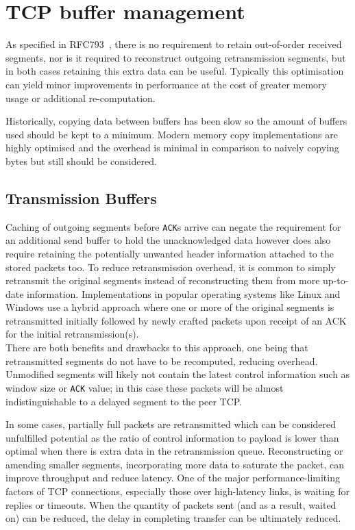     \section{TCP buffer management}
        As specified in RFC793~\cite{rfc793}, there is no requirement to retain out-of-order received segments, nor is it required to reconstruct outgoing retransmission segments, but in both cases retaining this extra data can be useful. Typically this optimisation can yield minor improvements in performance at the cost of greater memory usage or additional re-computation.

        Historically, copying data between buffers has been slow so the amount of buffers used should be kept to a minimum. Modern memory copy implementations are highly optimised and the overhead is minimal in comparison to naively copying bytes but still should be considered.

        \subsection{Transmission Buffers}
            Caching of outgoing segments before \texttt{ACK}s arrive can negate the requirement for an additional send buffer to hold the unacknowledged data however does also require retaining the potentially unwanted header information attached to the stored packets too. To reduce retransmission overhead, it is common to simply retransmit the original segments instead of reconstructing them from more up-to-date information. Implementations in popular operating systems like Linux and Windows use a hybrid approach where one or more of the original segments is retransmitted initially followed by newly crafted packets upon receipt of an ACK for the initial retransmission(s). \\ %
            There are both benefits and drawbacks to this approach, one being that retransmitted segments do not have to be recomputed, reducing overhead. Unmodified segments will likely not contain the latest control information such as window size or \texttt{ACK} value; in this case these packets will be almost indistinguishable to a delayed segment to the peer TCP\@.

            In some cases, partially full packets are retransmitted which can be considered unfulfilled potential as the ratio of control information to payload is lower than optimal when there is extra data in the retransmission queue. Reconstructing or amending smaller segments, incorporating more data to saturate the packet, can improve throughput and reduce latency. One of the major performance-limiting factors of TCP connections, especially those over high-latency links, is waiting for replies or timeouts. When the quantity of packets sent (and as a result, waited on) can be reduced, the delay in completing transfer can be ultimately reduced.


